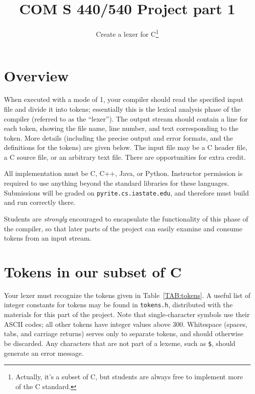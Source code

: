 \documentclass{article}
\title{COM S 440/540 Project part 1}
\author{Create a lexer for C\thanks{Actually, it's a subset of C,
but students are always free to implement more of the C standard.}}
\date{}
\begin{document}
\maketitle

\section{Overview}

When executed with a mode of 1,
your compiler should read the specified input file
and divide it into tokens;
essentially this is the lexical analysis phase of the compiler
(referred to as the ``lexer'').
The output stream should contain
a line for each token,
showing the file name, line number, and text corresponding to the token.
More details (including the precise output and error formats,
and the definitions for the tokens) are given below.
The input file may be a C header file, a C source file,
or an arbitrary text file.
There are opportunities for extra credit.

All implementation must be C, C++, Java, or Python.
Instructor permission is required to use anything beyond
the standard libraries for these languages.
Submissions will be graded on {\tt pyrite.cs.iastate.edu},
and therefore must build and run correctly there.

Students are \emph{strongly} encouraged
to encapsulate the functionality of this phase of the compiler,
so that later parts of the project can easily
examine and consume tokens from an input stream.

\section{Tokens in our subset of C}

Your lexer must recognize the tokens
given in Table~\ref{TAB:tokens}.
A useful list of integer constants for tokens may be found in {\tt tokens.h},
distributed with the materials for this part of the project.
Note that single-character symbols use their ASCII codes;
all other tokens have integer values above 300.
Whitespace (spaces, tabs, and carriage returns) serves only to separate
tokens, and should otherwise be discarded.
Any characters that are not part of a lexeme,
such as \verb|$|,
should generate an error message.
\end{document}
